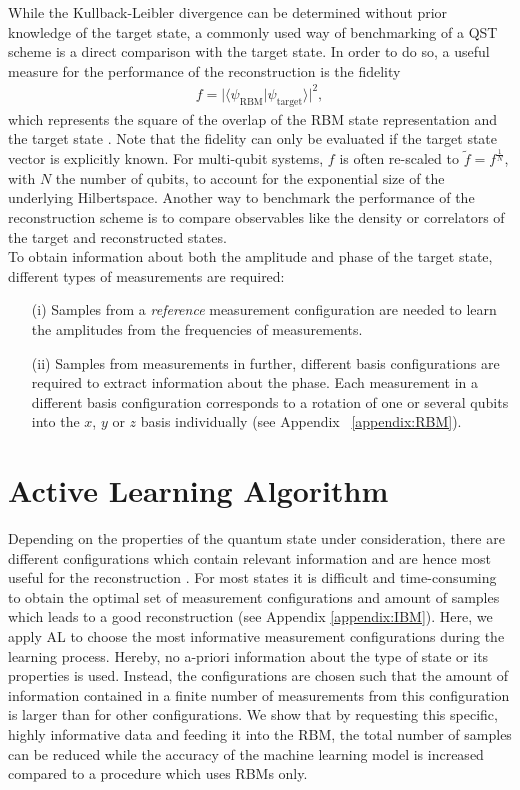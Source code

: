 \documentclass[pra,aps,showpacs,groupedaddress,superscriptaddress,twocolumn,toc=flat,biblatex,footinbib]{revtex4-1}
\begin{document}
While the Kullback-Leibler divergence can be determined without prior knowledge of the target state, a commonly used way of benchmarking of a QST scheme is a direct comparison with the target state. In order to do so, a useful measure for the performance of the reconstruction is the fidelity
\begin{align}
    f = \vert \langle \psi_\mathrm{RBM} \vert \psi_\mathrm{target} \rangle \vert ^2,
    \label{eq:Fidelity}
\end{align}
which represents the square of the overlap of the RBM state representation and the target state \cite{QucumberDoku}. Note that the fidelity can only be evaluated if the target state vector is explicitly known. For multi-qubit systems, $f$ is often re-scaled to $\tilde{f} = f^\frac{1}{N}$, with $N$ the number of qubits, to account for the exponential size of the underlying Hilbertspace. Another way to benchmark the performance of the reconstruction scheme is to compare observables like the density or correlators of the target and reconstructed states.\\

To obtain information about both the amplitude and phase of the target state, different types of measurements are required: 
\begin{itemize}
    \item[(i)] Samples from a \textit{reference} measurement configuration are needed to learn the amplitudes from the frequencies of measurements.
    \item[(ii)] Samples from measurements in further, different basis configurations are required to extract information about the phase. Each measurement in a different basis configuration corresponds to a rotation of one or several qubits into the $x$, $y$ or $z$ basis individually (see Appendix ~\ref{appendix:RBM}). 
\end{itemize} 


\section{Active Learning Algorithm \label{sec:Model}}

Depending on the properties of the quantum state under consideration, there are different configurations which contain relevant information and are hence most useful for the reconstruction \cite{Mahler2013}. For most states it is difficult and time-consuming to obtain the optimal set of measurement configurations and amount of samples which leads to a good reconstruction (see Appendix \ref{appendix:IBM}). Here, we apply AL to choose the most informative measurement configurations during the learning process. Hereby, no a-priori information about the type of state or its properties is used. Instead, the configurations are chosen such that the amount of information contained in a finite number of measurements from this configuration is larger than for other configurations. We show that by requesting this specific, highly informative data and feeding it into the RBM, the total number of samples can be reduced while the accuracy of the machine learning model is increased compared to a procedure which uses RBMs only.   
\end{document}
